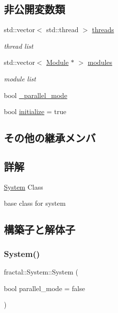 \subsection*{非公開変数類}
\begin{DoxyCompactItemize}
\item 
std\+::vector$<$ std\+::thread $>$ \hyperlink{classfractal_1_1System_a6da1d544119f50d90f71cf7d4ba53007}{threads}
\begin{DoxyCompactList}\small\item\em thread list \end{DoxyCompactList}\item 
std\+::vector$<$ \hyperlink{classfractal_1_1Module}{Module} $\ast$ $>$ \hyperlink{classfractal_1_1System_ab458c473c6203ab1f82adb08cdada89a}{modules}
\begin{DoxyCompactList}\small\item\em module list \end{DoxyCompactList}\item 
bool \hyperlink{classfractal_1_1System_a740b45f120349f503425770aa3926863}{\+\_\+parallel\+\_\+mode}
\item 
bool \hyperlink{classfractal_1_1System_aa14a55323502d83d3e2f949dd33e0747}{initialize} = true
\end{DoxyCompactItemize}
\subsection*{その他の継承メンバ}


\subsection{詳解}
\hyperlink{classfractal_1_1System}{System} Class 

base class for system 

\subsection{構築子と解体子}
\mbox{\label{classfractal_1_1System_a2d135113ff09a5cce9871ab696b40087}} 
\subsubsection{\texorpdfstring{System()}{System()}}
{\footnotesize\ttfamily fractal\+::\+System\+::\+System (\begin{DoxyParamCaption}\item[{bool}]{parallel\+\_\+mode = {\ttfamily false} }\end{DoxyParamCaption})\hspace{0.3cm}{\ttfamily [inline]}}



